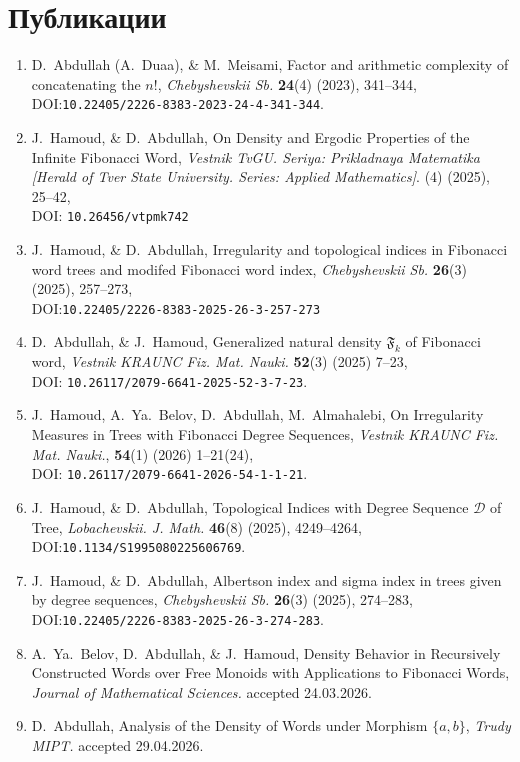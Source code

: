 \documentclass[a4paper,14pt]{extreport}
\theoremstyle{plain}
\theoremstyle{definition}
\theoremstyle{remark}
\begin{document}
	\section*{Публикации}
	\begin{enumerate}
		
		\item D.~Abdullah (A.~Duaa), \& M.~Meisami, Factor and arithmetic complexity of concatenating the $n!$, {\em Chebyshevskii Sb.} \textbf{24}(4) (2023), 341--344, \\ DOI:{\tt10.22405/2226-8383-2023-24-4-341-344}.
		
		\item J.~Hamoud, \& D.~Abdullah, On Density and Ergodic Properties of the Infinite Fibonacci Word, {\em Vestnik TvGU. Seriya: Prikladnaya Matematika [Herald of Tver State University. Series: Applied Mathematics]}.  (4) (2025),  25--42,\\  DOI: {\tt10.26456/vtpmk742}
		
		\item J.~Hamoud, \& D.~Abdullah, Irregularity and topological indices in Fibonacci word trees and modifed Fibonacci word index, {\em Chebyshevskii Sb.} \textbf{26}(3) (2025), 257--273, \\  DOI:{\tt10.22405/2226-8383-2025-26-3-257-273}
		
		\item D.~Abdullah, \&  J.~Hamoud, Generalized natural density $\mathfrak F_k$ of Fibonacci word, {\em Vestnik KRAUNC Fiz. Mat. Nauki.} \textbf{52}(3) (2025) 7--23, \\ DOI: {\tt10.26117/2079-6641-2025-52-3-7-23}.
		
		\item J.~Hamoud, A.~Ya.~Belov, D.~Abdullah, M.~Almahalebi, On Irregularity Measures in Trees with Fibonacci Degree Sequences, {\em Vestnik KRAUNC Fiz. Mat. Nauki.},  \textbf{54}(1) (2026) 1--21(24), \\ DOI: {\tt 10.26117/2079-6641-2026-54-1-1-21}.
		
		\item  J.~Hamoud, \& D.~Abdullah, Topological Indices with Degree Sequence $\mathscr{D}$ of Tree, {\em Lobachevskii. J. Math.} \textbf{46}(8) (2025), 4249--4264,\\ DOI:{\tt10.1134/S1995080225606769}.
		
		\item J.~Hamoud, \& D.~Abdullah, Albertson index and sigma index in trees given by degree sequences, {\em Chebyshevskii Sb.} \textbf{26}(3) (2025), 274--283,\\
		DOI:{\tt10.22405/2226-8383-2025-26-3-274-283}.
		
		\item A.~Ya.~Belov, D.~Abdullah, \& J.~Hamoud, Density Behavior in Recursively Constructed Words over Free Monoids with Applications to Fibonacci Words, {\em Journal of Mathematical Sciences.} accepted 24.03.2026.
		
		\item D.~Abdullah, Analysis of the Density of Words under Morphism $\{a,b\}$, {\em Trudy MIPT.} accepted 29.04.2026.
		
	\end{enumerate}
\end{document}
